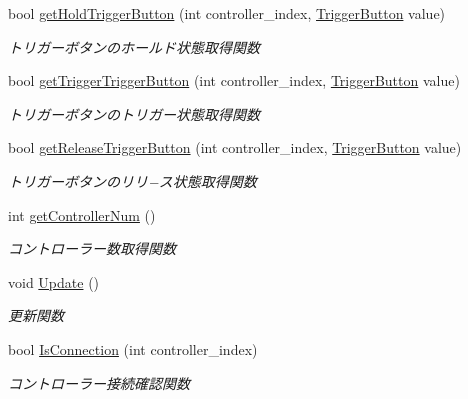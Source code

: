 \begin{DoxyCompactItemize}
bool \mbox{\hyperlink{class_controller_acf3ce5dd4a886553f53a237ec02383ac}{get\+Hold\+Trigger\+Button}} (int controller\+\_\+index, \mbox{\hyperlink{class_controller_abd7dd769d06d277d3aae9afcf135a4ee}{Trigger\+Button}} value)
\begin{DoxyCompactList}\small\item\em トリガーボタンのホールド状態取得関数 \end{DoxyCompactList}\item 
bool \mbox{\hyperlink{class_controller_a5b04c7d6998a75601a5af2854a887c5e}{get\+Trigger\+Trigger\+Button}} (int controller\+\_\+index, \mbox{\hyperlink{class_controller_abd7dd769d06d277d3aae9afcf135a4ee}{Trigger\+Button}} value)
\begin{DoxyCompactList}\small\item\em トリガーボタンのトリガー状態取得関数 \end{DoxyCompactList}\item 
bool \mbox{\hyperlink{class_controller_a329f08fd8b8293494a1d365148cb195e}{get\+Release\+Trigger\+Button}} (int controller\+\_\+index, \mbox{\hyperlink{class_controller_abd7dd769d06d277d3aae9afcf135a4ee}{Trigger\+Button}} value)
\begin{DoxyCompactList}\small\item\em トリガーボタンのリリ−ス状態取得関数 \end{DoxyCompactList}\item 
int \mbox{\hyperlink{class_controller_a8bb801356986692b32f989574af8d669}{get\+Controller\+Num}} ()
\begin{DoxyCompactList}\small\item\em コントローラー数取得関数 \end{DoxyCompactList}\item 
void \mbox{\hyperlink{class_controller_a6f23f649f5dc2255706f2f151bf30690}{Update}} ()
\begin{DoxyCompactList}\small\item\em 更新関数 \end{DoxyCompactList}\item 
bool \mbox{\hyperlink{class_controller_a9c3ec253ef99efe57471c6e62efe3dcf}{Is\+Connection}} (int controller\+\_\+index)
\begin{DoxyCompactList}\small\item\em コントローラー接続確認関数 \end{DoxyCompactList}\end{DoxyCompactItemize}
